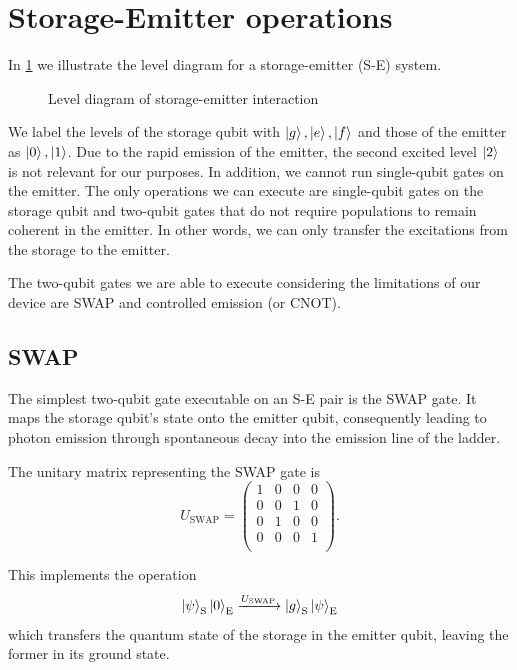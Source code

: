 \section{Storage-Emitter operations}
\label{sec:S-E}

In \cref{fig:level_S-E} we illustrate the level diagram for a storage-emitter (S-E) system.
\begin{figure}[h]
    \centering
    
    \vspace{-1cm}
    \caption{Level diagram of storage-emitter interaction}
    \label{fig:level_S-E}
\end{figure}

We label the levels of the storage qubit with $\ket{g}, \ket{e}, \ket{f}$ and those of the emitter as $\ket{0}, \ket{1}$.
Due to the rapid emission of the emitter, the second excited level $\ket{2}$ is not relevant for our purposes.
In addition, we cannot run single-qubit gates on the emitter.
The only operations we can execute are single-qubit gates on the storage qubit and two-qubit gates that do not require populations to remain coherent in the emitter.
In other words, we can only transfer the excitations from the storage to the emitter.

The two-qubit gates we are able to execute considering the limitations of our device are SWAP and controlled emission (or CNOT).

\subsection{SWAP}


The simplest two-qubit gate executable on an S-E pair is the SWAP gate. 
It maps the storage qubit's state onto the emitter qubit, consequently leading to photon emission through spontaneous decay into the emission line of the ladder.

The unitary matrix representing the SWAP gate is
\begin{equation}
    U_{\text{SWAP}} = 
    \begin{pmatrix}
    1 & 0 & 0 & 0 \\
    0 & 0 & 1 & 0 \\
    0 & 1 & 0 & 0 \\
    0 & 0 & 0 & 1 \\
\end{pmatrix}.
\end{equation}

This implements the operation
\begin{equation}
    \ket{\psi}_{\text{S}} \ket{0}_{\text{E}} \xrightarrow{U_{\text{SWAP}}}
    \ket{g}_{\text{S}} \ket{\psi}_{\text{E}}
\end{equation}
which transfers the quantum state of the storage in the emitter qubit, leaving the former in its ground state.

